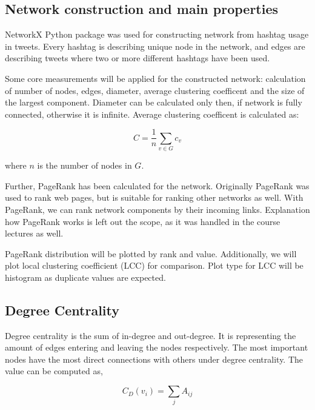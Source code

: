 \subsection{Network construction and main properties}

NetworkX Python package was used for constructing network from hashtag usage in tweets.
Every hashtag is describing unique node in the network, and edges are describing tweets where two or more different hashtags have been used.

Some core measurements will be applied for the constructed network:  calculation of number of nodes, edges, diameter, average clustering coefficent and the size of the largest component.
Diameter can be calculated only then, if network is fully connected, otherwise it is infinite.
Average clustering coefficent is calculated as:

\begin{equation*}\label{eq:clustering-coefficient}
C = \frac{1}{n}\sum_{v \in G} c_v \tag{1}
\end{equation*}

\noindent where $n$ is the number of nodes in $G$.

Further, PageRank has been calculated for the network.
Originally PageRank was used to rank web pages, but is suitable for ranking other networks as well. \cite{ilprints422}
With PageRank, we can rank network components by their incoming links.
Explanation how PageRank works is left out the scope, as it was handled in the course lectures as well.

PageRank distribution will be plotted by rank and value.
Additionally, we will plot local clustering coefficient (LCC) for comparison.
Plot type for LCC will be histogram as duplicate values are expected.

\subsection{Degree Centrality}

Degree centrality is the sum of in-degree and out-degree.
It is representing the amount of edges entering and leaving the nodes respectively.
The most important nodes have the most direct connections with others under degree centrality.
The value can be computed as,

\begin{equation*}\label{eq:degree-centrality}
C_{D}(v_{i})={\sum}_{j}A_{ij} \tag{2}
\end{equation*}

